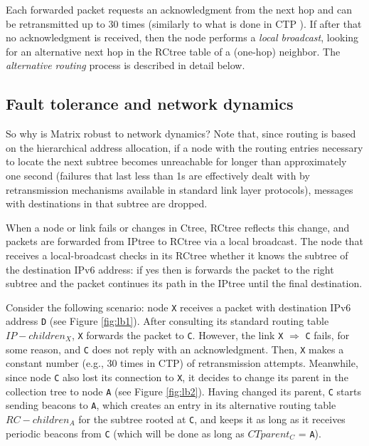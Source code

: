 Each forwarded packet requests an acknowledgment from the next hop and can be retransmitted up to 30 times (similarly to what is done in CTP \cite{Fonseca:2009}). If after that no acknowledgment is received, then the node performs a \textit{local broadcast}, looking for an alternative next hop in the RCtree table of a (one-hop) neighbor. The \textit{alternative routing} process is described in detail below.

\subsection{Fault tolerance and network dynamics}
\label{subsec:localBroadcast}

So why is Matrix robust to network dynamics? Note that, since routing is based on the hierarchical address allocation, if a node with the routing entries necessary to locate the next subtree becomes unreachable for longer than approximately one second (failures that last less than 1s are effectively dealt with by retransmission mechanisms available in standard link layer protocols), messages with destinations in that subtree are dropped.

When a node or link fails or changes in Ctree, RCtree reflects this change, and packets are forwarded from IPtree to RCtree via a local broadcast. The node that receives a local-broadcast checks in its RCtree whether it knows the subtree of the destination IPv6 address: if yes then is forwards the packet to the right subtree and the packet continues its path in the IPtree until the final destination.



Consider the following scenario: node \texttt{X} receives a packet with destination IPv6 address \texttt{D} (see Figure \ref{fig:lb1}). After consulting its standard routing table $IP-children_X$, \texttt{X} forwards the packet to \texttt{C}. However, the link \texttt{X} $\Rightarrow$ \texttt{C} fails, for some reason, and \texttt{C} does not reply with an acknowledgment. Then, \texttt{X} makes a constant number (e.g., 30 times in CTP) of retransmission attempts. Meanwhile, since node \texttt{C} also lost its connection to \texttt{X}, it decides to  change its parent in the collection tree to node \texttt{A} (see Figure \ref{fig:lb2}). Having changed its parent, \texttt{C} starts sending beacons to \texttt{A}, which creates an entry in its alternative routing table $RC-children_A$ for the subtree rooted at \texttt{C}, and keeps it as long as it receives periodic beacons from \texttt{C} (which will be done as long as $CTparent_C$ = \texttt{A}).

